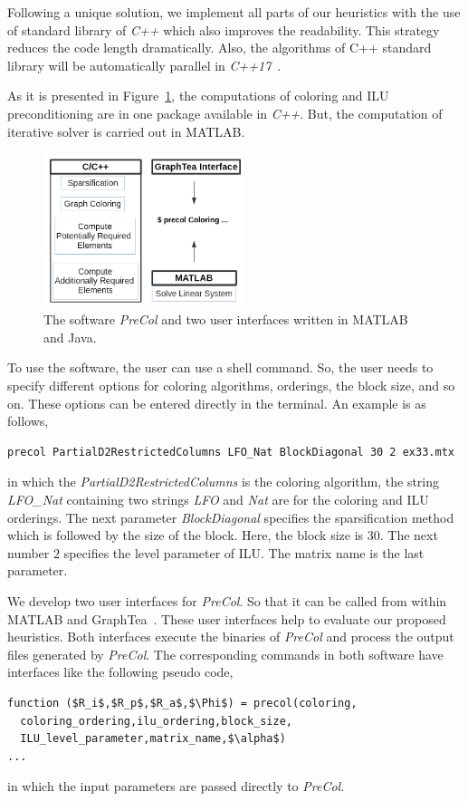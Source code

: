 \documentclass[12pt, twoside,a4paper,toc=bibliography]{scrbook}
\newcommand{\figref}[1]{Figure~\protect\ref{#1}}
\begin{document}
Following a unique solution, we implement all parts of our heuristics
with the use of standard library of \textit{C++} which also improves the readability.
This strategy reduces the code length dramatically.
Also, the algorithms of C++ standard library will be automatically parallel in \textit{C++17}~\cite{parallelcpp}.

As it is presented in \figref{f.structure}, the computations of coloring and ILU preconditioning
are in one package available in \textit{C++}. But, the computation of iterative solver is carried out
in MATLAB.
\begin{figure}
\centering
\includegraphics[width=0.52\textwidth]{new_struct}
\caption{
The software \textit{PreCol} and two user interfaces written in MATLAB and Java.}
\label{f.structure}
\end{figure}

To use the software, the user can use a shell command.
So, the user needs to specify different
options for coloring algorithms, orderings, the block size, and so on.
These options can be entered directly in the terminal.
An example is as follows,
\begin{lstlisting}
precol PartialD2RestrictedColumns LFO_Nat BlockDiagonal 30 2 ex33.mtx
\end{lstlisting}
in which the \textit{PartialD2RestrictedColumns} is the coloring algorithm,
the string \textit{LFO\_Nat} containing
two strings \textit{LFO} and \textit{Nat} are for the coloring and ILU orderings.
The next parameter \textit{BlockDiagonal} specifies the sparsification method
which is followed by the size of the block. Here, the block size is $30$.
The next number $2$ specifies the level parameter of ILU.
The matrix name is the last parameter.

We develop two user interfaces for \textit{PreCol}.
So that it can be called from within MATLAB and GraphTea~\cite{2014:07,2014:15}.
These user interfaces help to evaluate our proposed heuristics.
Both interfaces execute the binaries of \textit{PreCol}
and process the output files generated by \textit{PreCol}.
The corresponding commands in both software have interfaces like the following pseudo code,
\begin{lstlisting}[mathescape]
function ($R_i$,$R_p$,$R_a$,$\Phi$) = precol(coloring,
  coloring_ordering,ilu_ordering,block_size,
  ILU_level_parameter,matrix_name,$\alpha$)
...
\end{lstlisting}
in which the input parameters are passed directly to \textit{PreCol}.
\end{document}
